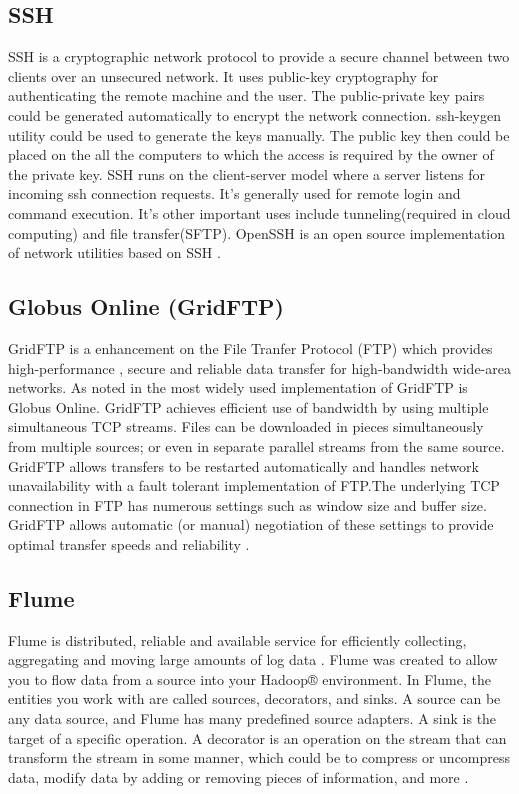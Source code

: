 \subsection{SSH}

     SSH is a cryptographic network protocol \cite{www-ssh-wiki} to
     provide a secure channel between two clients over an unsecured
     network. It uses public-key cryptography for authenticating the
     remote machine and the user. The public-private key pairs could
     be generated automatically to encrypt the network connection.
     ssh-keygen utility could be used to generate the keys manually.
     The public key then could be placed on the all the computers to
     which the access is required by the owner of the private key.
     SSH runs on the client-server model where a server listens for
     incoming ssh connection requests. It's generally used for remote
     login and command execution. It's other important uses include
     tunneling(required in cloud computing) and file transfer(SFTP).
     OpenSSH is an open source implementation of network utilities
     based on SSH \cite{www-openssh-wiki}.

\subsection{Globus Online (GridFTP)}

     GridFTP is a enhancement on the File Tranfer Protocol (FTP) which
     provides high-performance , secure and reliable data transfer for
     high-bandwidth wide-area networks. As noted in
     \cite{www-GlobusOnline} the most widely used implementation of
     GridFTP is Globus Online. GridFTP achieves efficient use of
     bandwidth by using multiple simultaneous TCP streams.  Files can
     be downloaded in pieces simultaneously from multiple sources; or
     even in separate parallel streams from the same source. GridFTP
     allows transfers to be restarted automatically and handles
     network unavailability with a fault tolerant implementation of
     FTP.The underlying TCP connection in FTP has numerous settings
     such as window size and buffer size. GridFTP allows automatic (or
     manual) negotiation of these settings to provide optimal transfer
     speeds and reliability .


\subsection{Flume}

     Flume is distributed, reliable and available service for
     efficiently collecting, aggregating and moving large amounts of
     log data \cite{apache-flume}. Flume was created to allow you to
     flow data from a source into your Hadoop® environment.  In Flume,
     the entities you work with are called sources, decorators, and
     sinks. A source can be any data source, and Flume has many
     predefined source adapters. A sink is the target of a specific
     operation. A decorator is an operation on the stream that can
     transform the stream in some manner, which could be to compress
     or uncompress data, modify data by adding or removing pieces of
     information, and more \cite{ibm-flume}.

